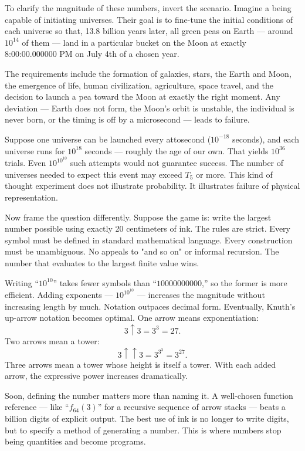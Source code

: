To clarify the magnitude of these numbers, invert the scenario. Imagine a being capable of initiating universes. Their goal is to fine-tune the initial conditions of each universe so that, 13.8 billion years later, all green peas on Earth — around $10^{14}$ of them — land in a particular bucket on the Moon at exactly 8:00:00.000000 PM on July 4th of a chosen year.

The requirements include the formation of galaxies, stars, the Earth and Moon, the emergence of life, human civilization, agriculture, space travel, and the decision to launch a pea toward the Moon at exactly the right moment. Any deviation — Earth does not form, the Moon’s orbit is unstable, the individual is never born, or the timing is off by a microsecond — leads to failure.

Suppose one universe can be launched every attosecond ($10^{-18}$ seconds), and each universe runs for $10^{18}$ seconds — roughly the age of our own. That yields $10^{36}$ trials. Even $10^{10^{10}}$ such attempts would not guarantee success. The number of universes needed to expect this event may exceed $T_5$ or more. This kind of thought experiment does not illustrate probability. It illustrates failure of physical representation.

Now frame the question differently. Suppose the game is: write the largest number possible using exactly 20 centimeters of ink. The rules are strict. Every symbol must be defined in standard mathematical language. Every construction must be unambiguous. No appeals to "and so on" or informal recursion. The number that evaluates to the largest finite value wins.

Writing “$10^{10}$” takes fewer symbols than “$10000000000$,” so the former is more efficient. Adding exponents — $10^{10^{10}}$ — increases the magnitude without increasing length by much. Notation outpaces decimal form. Eventually, Knuth’s up-arrow notation becomes optimal. One arrow means exponentiation:
\[
3 \uparrow 3 = 3^3 = 27.
\]
Two arrows mean a tower: 
\[
3 \uparrow\uparrow 3 = 3^{3^3} = 3^{27}.
\]
Three arrows mean a tower whose height is itself a tower. With each added arrow, the expressive power increases dramatically.

Soon, defining the number matters more than naming it. A well-chosen function reference — like “$f_{64}(3)$” for a recursive sequence of arrow stacks — beats a billion digits of explicit output. The best use of ink is no longer to write digits, but to specify a method of generating a number. This is where numbers stop being quantities and become programs.

